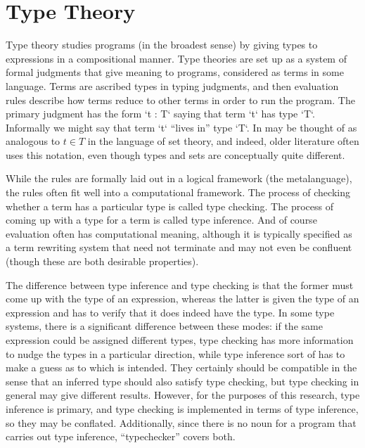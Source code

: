 \documentclass[11pt, twoside, reqno]{book}
\begin{document}

\section{Type Theory}
\label{TT}

Type theory studies programs (in the broadest sense) by giving types to expressions in a compositional manner.
Type theories are set up as a system of formal judgments that give meaning to programs, considered as terms in some language.
Terms are ascribed types in typing judgments, and then evaluation rules describe how terms reduce to other terms in order to run the program.
The primary judgment has the form \inHS`t : T` saying that term \inHS`t` has type \inHS`T`.
Informally we might say that term \inHS`t` ``lives in'' type \inHS`T`.
In may be thought of as analogous to \(t \in T\) in the language of set theory, and indeed, older literature often uses this notation, even though types and sets are conceptually quite different.

While the rules are formally laid out in a logical framework (the metalanguage), the rules often fit well into a computational framework.
The process of checking whether a term has a particular type is called type checking.
The process of coming up with a type for a term is called type inference.
And of course evaluation often has computational meaning, although it is typically specified as a term rewriting system that need not terminate and may not even be confluent (though these are both desirable properties).

The difference between type inference and type checking is that the former must come up with the type of an expression, whereas the latter is given the type of an expression and has to verify that it does indeed have the type.
In some type systems, there is a significant difference between these modes: if the same expression could be assigned different types, type checking has more information to nudge the types in a particular direction, while type inference sort of has to make a guess as to which is intended.
They certainly should be compatible in the sense that an inferred type should also satisfy type checking, but type checking in general may give different results.
However, for the purposes of this research, type inference is primary, and type checking is implemented in terms of type inference, so they may be conflated.
Additionally, since there is no noun for a program that carries out type inference, ``typechecker'' covers both.
\end{document}
